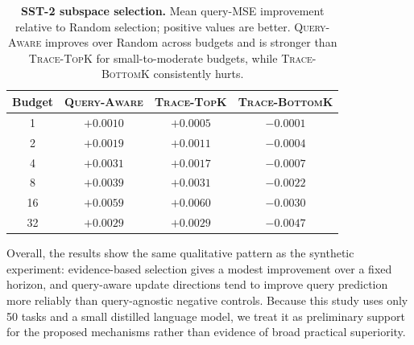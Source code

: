 \documentclass{article}
\theoremstyle{plain}
\theoremstyle{definition}
\theoremstyle{remark}
\begin{document}
\begin{table}[h]
\centering
\small
\begin{tabular}{cccc}
\toprule
Budget & \textsc{Query-Aware} & \textsc{Trace-TopK} & \textsc{Trace-BottomK} \\
\midrule
1  & $+0.0010$ & $+0.0005$ & $-0.0001$ \\
2  & $+0.0019$ & $+0.0011$ & $-0.0004$ \\
4  & $+0.0031$ & $+0.0017$ & $-0.0007$ \\
8  & $+0.0039$ & $+0.0031$ & $-0.0022$ \\
16 & $+0.0059$ & $+0.0060$ & $-0.0030$ \\
32 & $+0.0029$ & $+0.0029$ & $-0.0047$ \\
\bottomrule
\end{tabular}
\caption{\textbf{SST-2 subspace selection.} Mean query-MSE improvement relative to Random selection; positive values are better. \textsc{Query-Aware} improves over Random across budgets and is stronger than \textsc{Trace-TopK} for small-to-moderate budgets, while \textsc{Trace-BottomK} consistently hurts.}
\label{tab:app_sst2_subspace}
\end{table}

Overall, the results show the same qualitative pattern as the synthetic experiment: evidence-based selection gives a modest improvement over a fixed horizon, and query-aware update directions tend to improve query prediction more reliably than query-agnostic negative controls. Because this study uses only 50 tasks and a small distilled language model, we treat it as preliminary support for the proposed mechanisms rather than evidence of broad practical superiority.
\end{document}
